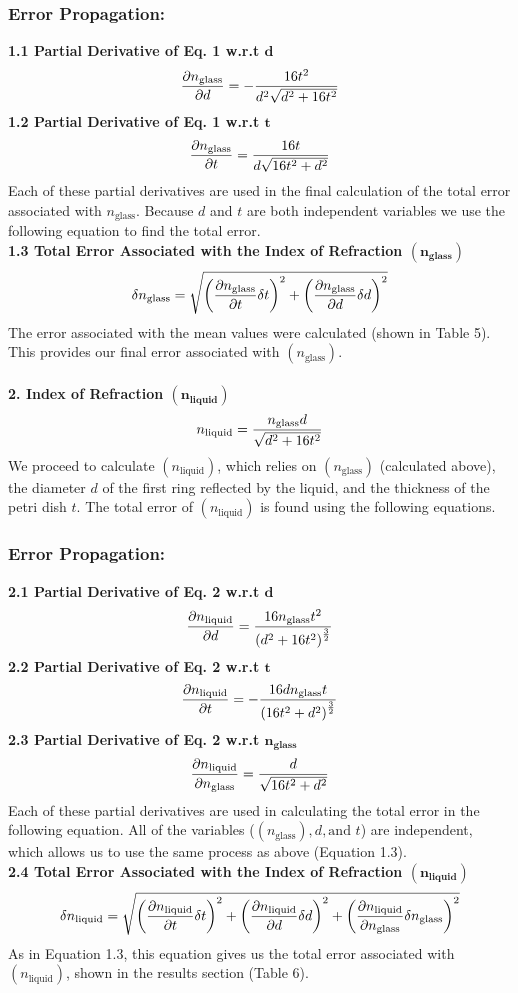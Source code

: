 \documentclass[12pt]{article}
\begin{document}
\subsubsection*{Error Propagation:}
    \noindent\textbf{1.1 Partial Derivative of Eq. 1 w.r.t $\bm d$}\[\frac{\partial n_{\textnormal{glass}}}{\partial d}=-\dfrac{16t^2}{d^2\sqrt{d^2+16t^2}}\]
    \textbf{1.2 Partial Derivative of Eq. 1 w.r.t $\bm t$} \[\frac{\partial n_{\textnormal{glass}}}{\partial t}=\dfrac{16t}{d\sqrt{16t^2+d^2}}\]
    Each of these partial derivatives are used in the final calculation of the total error associated with $n_\text{glass}.$ Because $d$ and $t$ are both independent variables we use the following equation to find the total error.\\
    \textbf{1.3 Total Error Associated with the Index of Refraction $\bm{({n_{\textbf{glass}}})}$}\[\delta n_{\textnormal{glass}} =\sqrt{\left(\frac{\partial n_{\textnormal{glass}}}{\partial t}\delta t\right)^2+\left(\frac{\partial n_{\textnormal{glass}}}{\partial d}\delta d\right)^2}\]
    The error associated with the mean values were calculated (shown in Table 5). This provides our final error associated with $(n_\text{glass})$.\\
\\\textbf{2. Index of Refraction $\bm{({n_{\textbf{liquid}}})}$}\[n_{\textnormal{liquid}}=\frac{n_{\textnormal{glass}}d}{\sqrt{d^2+16t^2}}\]
    We proceed to calculate $(n_\text{liquid})$, which relies on $(n_\text{glass})$ (calculated above), the diameter $d$ of the first ring reflected by the liquid, and the thickness of the petri dish $t$. The total error of $(n_\text{liquid})$ is found using the following equations.
\subsubsection*{Error Propagation:}
    \noindent\textbf{2.1 Partial Derivative of Eq. 2 w.r.t $\bm d$}\[\frac{\partial n_{\textnormal{liquid}}}{\partial d}=\dfrac{16n_\textnormal{glass}t^2}{\left(d^2+16t^2\right)^\frac{3}{2}}\]
    \textbf{2.2 Partial Derivative of Eq. 2 w.r.t $\bm t$} \[\frac{\partial n_{\textnormal{liquid}}}{\partial t}=-\dfrac{16dn_\text{glass}t}{\left(16t^2+d^2\right)^\frac{3}{2}}\]
    \textbf{2.3 Partial Derivative of Eq. 2 w.r.t $\bm n_\textbf{glass}$}\[\frac{\partial n_{\textnormal{liquid}}}{\partial n_\text{glass}}=\dfrac{d}{\sqrt{16t^2+d^2}}\]
    Each of these partial derivatives are used in calculating the total error in the following equation. All of the variables ($(n_\text{glass}), d, \text{and } t$) are independent, which allows us to use the same process as above (Equation 1.3).\\
    \textbf{2.4 Total Error Associated with the Index of Refraction $\bm{({n_{\textbf{liquid}}})}$}\[\delta n_{\textnormal{liquid}} =\sqrt{\left(\frac{\partial n_{\textnormal{liquid}}}{\partial t}\delta t\right)^2+\left(\frac{\partial n_{\textnormal{liquid}}}{\partial d}\delta d\right)^2+\left(\frac{\partial n_{\textnormal{liquid}}}{\partial n_{\text{glass}}}\delta n_{\text{glass}}\right)^2}\]
    As in Equation 1.3, this equation gives us the total error associated with $(n_\text{liquid})$, shown in the results section (Table 6).
\end{document}
